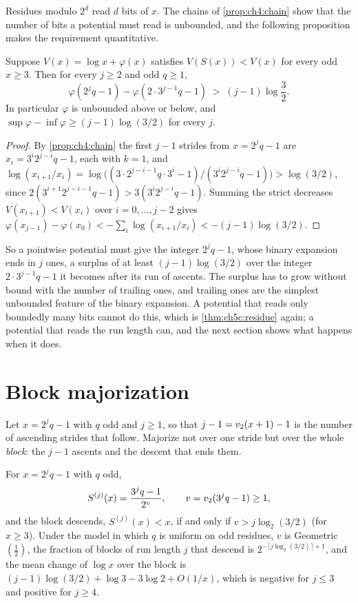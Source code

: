 Residues modulo $2^d$ read $d$ bits of $x$. The chains of
\cref{prop:ch4:chain} show that the number of bits a potential must read is
unbounded, and the following proposition makes the requirement quantitative.

\begin{proposition}\label{prop:ch5c:surplus}
Suppose $V(x)=\log x+\varphi(x)$ satisfies $V(S(x))<V(x)$ for every odd $x\ge3$.
Then for every $j\ge2$ and odd $q\ge1$,
\[
  \varphi(2^jq-1)-\varphi(2\cdot3^{j-1}q-1)\;>\;(j-1)\log\frac32 .
\]
In particular $\varphi$ is unbounded above or below, and
$\sup\varphi-\inf\varphi\ge(j-1)\log(3/2)$ for every $j$.
\end{proposition}

\begin{proof}
By \cref{prop:ch4:chain} the first $j-1$ strides from $x=2^jq-1$ are
$x_i=3^i2^{j-i}q-1$, each with $k=1$, and
$\log(x_{i+1}/x_i)=\log\bigl((3\cdot2^{j-i-1}q\cdot3^i-1)/(3^i2^{j-i}q-1)\bigr)
>\log(3/2)$, since $2(3^{i+1}2^{j-i-1}q-1)>3(3^i2^{j-i}q-1)$. Summing the
strict decreases $V(x_{i+1})<V(x_i)$ over $i=0,\dots,j-2$ gives
$\varphi(x_{j-1})-\varphi(x_0)<-\sum_i\log(x_{i+1}/x_i)<-(j-1)\log(3/2)$.
\end{proof}

So a pointwise potential must give the integer $2^jq-1$, whose binary expansion
ends in $j$ ones, a surplus of at least $(j-1)\log(3/2)$ over the integer
$2\cdot3^{j-1}q-1$ it becomes after its run of ascents. The surplus has to grow
without bound with the number of trailing ones, and trailing ones are the
simplest unbounded feature of the binary expansion. A potential that reads only
boundedly many bits cannot do this, which is \cref{thm:ch5c:residue} again; a
potential that reads the run length can, and the next section shows what
happens when it does.

\section{Block majorization}\label{sec:ch5c:block}

Let $x=2^jq-1$ with $q$ odd and $j\ge1$, so that $j-1=v_2(x+1)-1$ is the number
of ascending strides that follow. Majorize not over one stride but over the
whole \emph{block}: the $j-1$ ascents and the descent that ends them.

\begin{proposition}\label{prop:ch5c:block}
For $x=2^jq-1$ with $q$ odd,
\begin{equation}\label{eq:ch5c:block}
  S^{(j)}(x)=\frac{3^jq-1}{2^{v}},\qquad v=v_2(3^jq-1)\ge1,
\end{equation}
and the block descends, $S^{(j)}(x)<x$, if and only if $v>j\log_2(3/2)$ (for
$x\ge3$). Under the model in which $q$ is uniform on odd residues, $v$ is
Geometric$(\tfrac12)$, the fraction of blocks of run length $j$ that descend is
$2^{-\lceil j\log_2(3/2)\rceil+1}$, and the mean change of $\log x$ over the block
is $(j-1)\log(3/2)+\log3-3\log2+O(1/x)$, which is negative for $j\le3$ and
positive for $j\ge4$.
\end{proposition}

